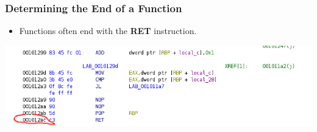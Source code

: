 \begin{frame}
    \frametitle{Determining the End of a Function}
    \begin{itemize}
        \item Functions often end with the \textbf{RET} instruction.
    \end{itemize}
    \vspace{1cm}
    \centering
    \includegraphics[scale=0.5]{img/end.png}
\end{frame}

